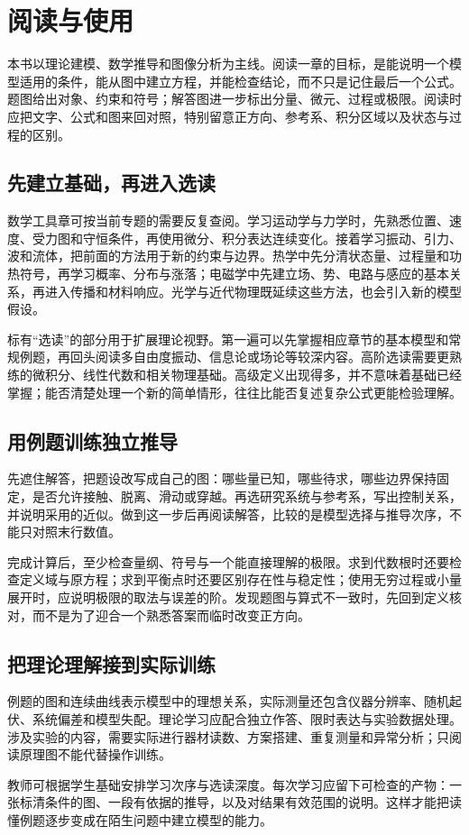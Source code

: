 \chapter*{阅读与使用}

本书以理论建模、数学推导和图像分析为主线。阅读一章的目标，是能说明一个模型适用的条件，能从图中建立方程，并能检查结论，而不只是记住最后一个公式。题图给出对象、约束和符号；解答图进一步标出分量、微元、过程或极限。阅读时应把文字、公式和图来回对照，特别留意正方向、参考系、积分区域以及状态与过程的区别。

\section*{先建立基础，再进入选读}
数学工具章可按当前专题的需要反复查阅。学习运动学与力学时，先熟悉位置、速度、受力图和守恒条件，再使用微分、积分表达连续变化。接着学习振动、引力、波和流体，把前面的方法用于新的约束与边界。热学中先分清状态量、过程量和功热符号，再学习概率、分布与涨落；电磁学中先建立场、势、电路与感应的基本关系，再进入传播和材料响应。光学与近代物理既延续这些方法，也会引入新的模型假设。

标有“选读”的部分用于扩展理论视野。第一遍可以先掌握相应章节的基本模型和常规例题，再回头阅读多自由度振动、信息论或场论等较深内容。高阶选读需要更熟练的微积分、线性代数和相关物理基础。高级定义出现得多，并不意味着基础已经掌握；能否清楚处理一个新的简单情形，往往比能否复述复杂公式更能检验理解。

\section*{用例题训练独立推导}
先遮住解答，把题设改写成自己的图：哪些量已知，哪些待求，哪些边界保持固定，是否允许接触、脱离、滑动或穿越。再选研究系统与参考系，写出控制关系，并说明采用的近似。做到这一步后再阅读解答，比较的是模型选择与推导次序，不能只对照末行数值。

完成计算后，至少检查量纲、符号与一个能直接理解的极限。求到代数根时还要检查定义域与原方程；求到平衡点时还要区别存在性与稳定性；使用无穷过程或小量展开时，应说明极限的取法与误差的阶。发现题图与算式不一致时，先回到定义核对，而不是为了迎合一个熟悉答案而临时改变正方向。

\par\Needspace{.72\textheight}
\section*{把理论理解接到实际训练}
例题的图和连续曲线表示模型中的理想关系，实际测量还包含仪器分辨率、随机起伏、系统偏差和模型失配。理论学习应配合独立作答、限时表达与实验数据处理。涉及实验的内容，需要实际进行器材读数、方案搭建、重复测量和异常分析；只阅读原理图不能代替操作训练。

教师可根据学生基础安排学习次序与选读深度。每次学习应留下可检查的产物：一张标清条件的图、一段有依据的推导，以及对结果有效范围的说明。这样才能把读懂例题逐步变成在陌生问题中建立模型的能力。


